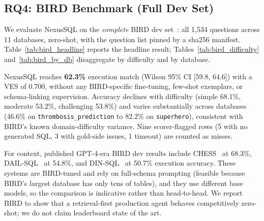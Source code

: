 \documentclass[conference]{IEEEtran}
\begin{document}
\subsection{RQ4: BIRD Benchmark (Full Dev Set)}
\label{sec:rq_bird}

We evaluate NexusSQL on the \emph{complete} BIRD dev set~\cite{bird}:
all 1,534 questions across 11 databases, zero-shot, with the question
list pinned by a sha256 manifest. Table~\ref{tab:bird_headline} reports
the headline result; Tables~\ref{tab:bird_difficulty}
and~\ref{tab:bird_by_db} disaggregate by difficulty and by database.

\begin{table}[!htb]
\caption{BIRD Dev Set Headline Result (1,534 Questions, Zero-Shot,
Manifest-Pinned)}
\label{tab:bird_headline}
\centering
\resizebox{\columnwidth}{!}{}
\end{table}

\begin{table}[!htb]
\caption{BIRD Dev Execution Match by Official Difficulty Label}
\label{tab:bird_difficulty}
\centering
\small

\end{table}

\begin{table}[!htb]
\caption{BIRD Dev Execution Match by Database}
\label{tab:bird_by_db}
\centering
\scriptsize
\setlength{\tabcolsep}{3pt}

\end{table}

NexusSQL reaches \textbf{62.3\%} execution match (Wilson 95\% CI
[59.8, 64.6]) with a VES of 0.700, without any BIRD-specific
fine-tuning, few-shot exemplars, or schema-linking supervision.
Accuracy declines with difficulty (simple 68.1\%, moderate 53.2\%,
challenging 53.8\%) and varies substantially across databases (46.6\%
on \texttt{thrombosis\_prediction} to 82.2\% on \texttt{superhero}),
consistent with BIRD's known domain-difficulty variance. Nine
scorer-flagged rows (5 with no generated SQL, 3 with gold-side issues,
1 timeout) are counted as misses.

For context, published GPT-4-era BIRD dev results include
CHESS~\cite{chess} at 68.3\%, DAIL-SQL~\cite{dailsql} at 54.8\%, and
DIN-SQL~\cite{dinsql} at 50.7\% execution accuracy. These systems are
BIRD-tuned and rely on full-schema prompting (feasible because BIRD's
largest database has only tens of tables), and they use different base
models, so the comparison is indicative rather than head-to-head. We
report BIRD to show that a retrieval-first production agent behaves
competitively zero-shot; we do not claim leaderboard state of the art.
\end{document}
